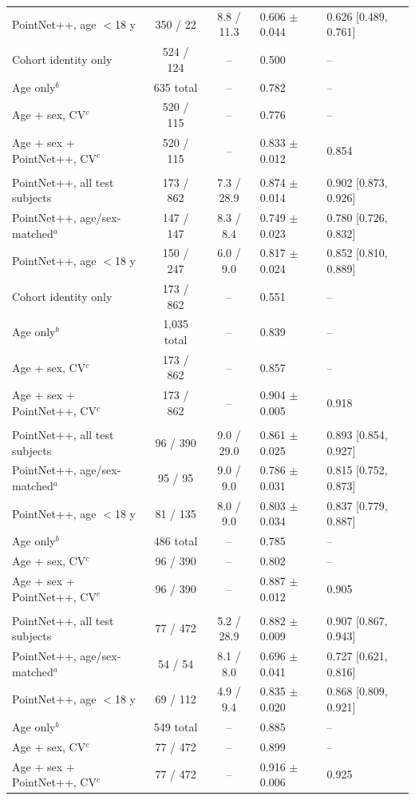 \begin{table}[h]
{\begin{tabular}{>{\raggedright\arraybackslash}p{5.2cm}ccll}
\quad PointNet++, age $<$18 y & 350 / 22 & 8.8 / 11.3 & 0.606 $\pm$ 0.044 & 0.626 [0.489, 0.761]\\
\quad Cohort identity only & 524 / 124 & -- & 0.500 & --\\
\quad Age only$^{b}$ & 635 total & -- & 0.782 & --\\
\quad Age + sex, CV$^{c}$ & 520 / 115 & -- & 0.776 & --\\
\quad Age + sex + PointNet++, CV$^{c}$ & 520 / 115 & -- & 0.833 $\pm$ 0.012 & 0.854\\
\addlinespace
\multicolumn{5}{l}{\textit{Cleft cohorts (FB-5A + FB-56)}}\\
\quad PointNet++, all test subjects & 173 / 862 & 7.3 / 28.9 & 0.874 $\pm$ 0.014 & 0.902 [0.873, 0.926]\\
\quad PointNet++, age/sex-matched$^{a}$ & 147 / 147 & 8.3 / 8.4 & 0.749 $\pm$ 0.023 & 0.780 [0.726, 0.832]\\
\quad PointNet++, age $<$18 y & 150 / 247 & 6.0 / 9.0 & 0.817 $\pm$ 0.024 & 0.852 [0.810, 0.889]\\
\quad Cohort identity only & 173 / 862 & -- & 0.551 & --\\
\quad Age only$^{b}$ & 1,035 total & -- & 0.839 & --\\
\quad Age + sex, CV$^{c}$ & 173 / 862 & -- & 0.857 & --\\
\quad Age + sex + PointNet++, CV$^{c}$ & 173 / 862 & -- & 0.904 $\pm$ 0.005 & 0.918\\
\addlinespace
\multicolumn{5}{l}{\textit{FB-5A}}\\
\quad PointNet++, all test subjects & 96 / 390 & 9.0 / 29.0 & 0.861 $\pm$ 0.025 & 0.893 [0.854, 0.927]\\
\quad PointNet++, age/sex-matched$^{a}$ & 95 / 95 & 9.0 / 9.0 & 0.786 $\pm$ 0.031 & 0.815 [0.752, 0.873]\\
\quad PointNet++, age $<$18 y & 81 / 135 & 8.0 / 9.0 & 0.803 $\pm$ 0.034 & 0.837 [0.779, 0.887]\\
\quad Age only$^{b}$ & 486 total & -- & 0.785 & --\\
\quad Age + sex, CV$^{c}$ & 96 / 390 & -- & 0.802 & --\\
\quad Age + sex + PointNet++, CV$^{c}$ & 96 / 390 & -- & 0.887 $\pm$ 0.012 & 0.905\\
\addlinespace
\multicolumn{5}{l}{\textit{FB-56}}\\
\quad PointNet++, all test subjects & 77 / 472 & 5.2 / 28.9 & 0.882 $\pm$ 0.009 & 0.907 [0.867, 0.943]\\
\quad PointNet++, age/sex-matched$^{a}$ & 54 / 54 & 8.1 / 8.0 & 0.696 $\pm$ 0.041 & 0.727 [0.621, 0.816]\\
\quad PointNet++, age $<$18 y & 69 / 112 & 4.9 / 9.4 & 0.835 $\pm$ 0.020 & 0.868 [0.809, 0.921]\\
\quad Age only$^{b}$ & 549 total & -- & 0.885 & --\\
\quad Age + sex, CV$^{c}$ & 77 / 472 & -- & 0.899 & --\\
\quad Age + sex + PointNet++, CV$^{c}$ & 77 / 472 & -- & 0.916 $\pm$ 0.006 & 0.925\\
\bottomrule\end{tabular}}
\end{table}

